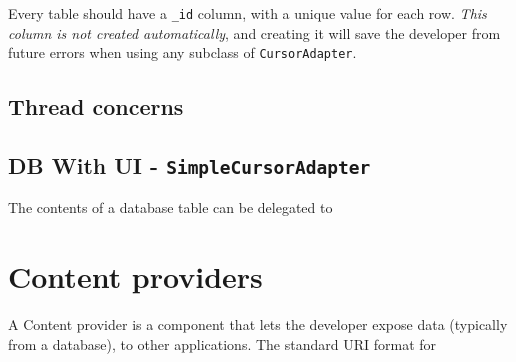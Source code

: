 \documentclass{article}
\def\cw#1{\texttt{#1}}
\begin{document}
Every table should have a \cw{\_id} column, with a unique value for each row. \emph{This column is not created automatically}, and creating it will save the developer from future errors when using any subclass of \cw{CursorAdapter}. 

\subsection{Thread concerns}

\subsection{DB With UI - \cw{SimpleCursorAdapter}}
The contents of a database table can be delegated to 

\section{Content providers}
A Content provider is a component that lets the developer expose data (typically from a database), to other applications. The standard URI format for 
\end{document}
